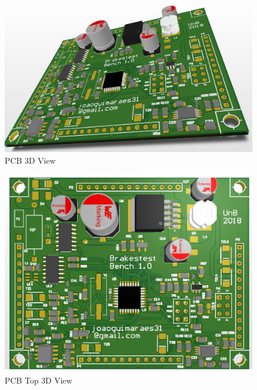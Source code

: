 
		\begin{figure}[htbp]
			\centering
			\includegraphics[scale=0.65]{figuras/fig-pcb-print-diagonal.png}
			\caption{PCB 3D View \cite{pcb-print-diagonal}}
			\label{fig:pcb-print-diagonal}
		\end{figure}

		\begin{figure}[htbp]
			\centering
			\includegraphics[scale=0.7]{figuras/fig-pcb-print-top.png}
			\caption{PCB Top 3D View \cite{pcb-print-top}}
			\label{fig:pcb-print-top}
		\end{figure}

